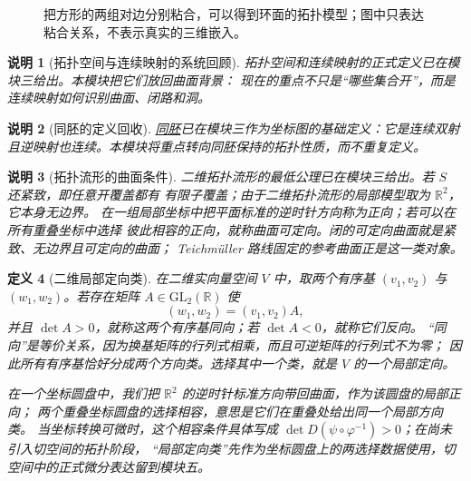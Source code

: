 \documentclass[UTF8,fontset=none,a4paper,11pt]{ctexart}
\theoremstyle{foundation-definition}
\newtheorem{definition}{定义}[section]
\theoremstyle{foundation-theorem}
\theoremstyle{foundation-proposition}
\theoremstyle{foundation-example}
\theoremstyle{foundation-remark}
\newtheorem{remark}[definition]{说明}
\theoremstyle{foundation-theorem}
\newcommand{\term}[2]{\hyperref[#1]{#2}}
\begin{document}
\begin{figure}[htbp]
\centering
{}
\caption{把方形的两组对边分别粘合，可以得到环面的拓扑模型；图中只表达粘合关系，不表示真实的三维嵌入。}
\label{fig:torus-gluing}
\end{figure}

\begin{remark}[拓扑空间与连续映射的系统回顾]
拓扑空间和连续映射的正式定义已在模块三给出。本模块把它们放回曲面背景：
现在的重点不只是“哪些集合开”，而是连续映射如何识别曲面、闭路和洞。
\end{remark}

\begin{remark}[同胚的定义回收]
\term{def:homeomorphism}{同胚}已在模块三作为坐标图的基础定义：它是连续双射且逆映射也连续。本模块将重点转向同胚保持的拓扑性质，而不重复定义。
\end{remark}

\begin{remark}[拓扑流形的曲面条件]
二维拓扑流形的最低公理已在模块三给出。若 \(S\) 还紧致，即任意开覆盖都有
有限子覆盖；由于二维拓扑流形的局部模型取为 \(\mathbb R^2\)，它本身无边界。
在一组局部坐标中把平面标准的逆时针方向称为正向；若可以在所有重叠坐标中选择
彼此相容的正向，就称曲面可定向。闭的可定向曲面就是紧致、无边界且可定向的曲面；
Teichmüller 路线固定的参考曲面正是这一类对象。
\end{remark}

\begin{definition}[二维局部定向类]\label{def:local-orientation-class}
在二维实向量空间 \(V\) 中，取两个有序基
\((v_1,v_2)\) 与 \((w_1,w_2)\)。若存在矩阵 \(A\in\mathrm{GL}_2(\mathbb R)\) 使
\[
(w_1,w_2)=(v_1,v_2)A,
\]
并且 \(\det A>0\)，就称这两个有序基同向；若 \(\det A<0\)，就称它们反向。
“同向”是等价关系，因为换基矩阵的行列式相乘，而且可逆矩阵的行列式不为零；
因此所有有序基恰好分成两个方向类。选择其中一个类，就是 \(V\) 的一个局部定向。

在一个坐标圆盘中，我们把 \(\mathbb R^2\) 的逆时针标准方向带回曲面，作为该圆盘的局部正向；
两个重叠坐标圆盘的选择相容，意思是它们在重叠处给出同一个局部方向类。
当坐标转换可微时，这个相容条件具体写成
\(\det D(\psi\circ\varphi^{-1})>0\)；在尚未引入切空间的拓扑阶段，
“局部定向类”先作为坐标圆盘上的两选择数据使用，切空间中的正式微分表达留到模块五。
\end{definition}
\end{document}
